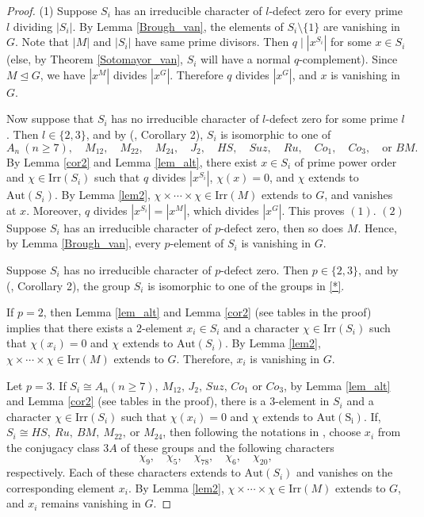 \documentclass[11pt, a4paper]{article}
\numberwithin{equation}{section}
\theoremstyle{plain} %
\begin{document}
\begin{proof}
(1) Suppose $S_i$ has an irreducible character of $l$-defect zero for every prime $l$ dividing $|S_i|$. By Lemma \ref{Brough_van}, the elements of $S_i\setminus\{1\}$ are vanishing in $G$. Note that $|M|$ and $|S_i|$ have same prime divisors. Then $q\mid |x^{S_i}|$ for some $x\in S_i$ (else, by Theorem \ref{Sotomayor_van}, $S_i$ will have a normal $q$-complement).  
Since $M\unlhd G$, we have $|x^M|$ divides $|x^G|$. Therefore $q$ divides $|x^G|$, and $x$ is vanishing in $G$.

Now suppose that $S_i$ has no irreducible character of $l$-defect zero for some
prime $l$. Then $l\in\{2,3\}$, and by (\cite{MR1321575}, Corollary 2), $S_i$ is
isomorphic to one of
\begin{equation}\label{*}
A_n\ (n\ge 7),\quad M_{12},\quad M_{22},\quad M_{24},\quad J_2,\quad HS,\quad
Suz,\quad Ru,\quad Co_1,\quad Co_3,\quad \text{or } BM.
\end{equation}
By Lemma \ref{cor2} and Lemma \ref{lem_alt}, there exist $x\in S_i$ of prime
power order and  $\chi\in \mathrm{Irr}(S_i)$ such that $q$ divides $|x^{S_i}|$,
$\chi(x)=0$, and $\chi$ extends to $\mathrm{Aut}(S_i)$. %
By Lemma \ref{lem2}, $\chi\times\cdots\times \chi\in \mathrm{Irr}(M)$
extends to $G$, and vanishes at $x$. Moreover, $q$ divides $|x^{S_i}|=|x^M|$, which divides $|x^G|$. This proves $(1)$.
\vskip2mm
$(2)$ Suppose $S_i$ has an irreducible character of $p$-defect zero, then so does $M$. Hence, by
Lemma \ref{Brough_van}, every $p$-element of $S_i$ is
vanishing in $G$. %

Suppose $S_i$ has no irreducible character of $p$-defect zero. Then
$p\in\{2,3\}$, and by (\cite{MR1321575}, Corollary 2), the group $S_i$ is
isomorphic to one of the groups in \ref{*}.     




If $p=2$, then Lemma \ref{lem_alt} and
Lemma \ref{cor2} (see tables in the proof) implies that there exists a $2$-element $x_i\in S_i$ and
a character $\chi\in \mathrm{Irr}(S_i)$ such that $\chi(x_i)=0$ and $\chi$ extends to $\mathrm{Aut}(S_i)$. By Lemma \ref{lem2}, $\chi\times\cdots\times \chi\in \mathrm{Irr}(M)$ extends to $G$. Therefore, $x_i$ is vanishing in $G$.

Let $p=3$. If $S_i\cong A_n(n\geq 7),\ M_{12},\, J_2,\, Suz,\, Co_1$ or  $Co_3$, by Lemma \ref{lem_alt} and Lemma \ref{cor2} (see tables in the proof), there is a $3$-element in $S_i$ and a character $\chi\in \mathrm{Irr}(S_i)$ such that $\chi(x_i)=0$ and $\chi$ extends to $\mathrm{Aut(S_i)}$. If, $S_i\cong HS,\ Ru,\ BM,\ M_{22},\ \text{or } M_{24}$, then following the notations in \cite{MR827219}, choose $x_i$ from the conjugacy class
$3A$ of these groups and the following characters
$$
\chi_9,\quad \chi_5,\quad \chi_{78},\quad \chi_6,\quad \chi_{20},
$$
respectively. Each of these characters extends to $\mathrm{Aut}(S_i)$ and vanishes on
the corresponding element $x_i$. By Lemma \ref{lem2}, $\chi\times\cdots\times \chi\in \mathrm{Irr}(M)$ extends to $G$, and $x_i$ remains vanishing in $G$.
\end{proof}
\end{document}
